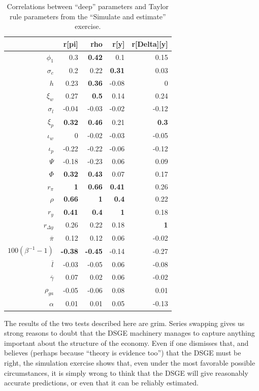 \documentclass[11pt]{article}
\begin{document}
\begin{table}

\caption{\label{tab:covary-with-Taylor}Correlations between ``deep'' parameters and Taylor rule parameters from the ``Simulate and estimate'' exercise.}
\centering
\begin{tabular}[t]{rrrrr}
\toprule
 & r[pi] & rho & r[y] & r[Delta][y]\\
\midrule
$\phi_1$ & 0.3 & \textbf{0.42} & 0.1 & 0.15\\
$\sigma_c$ & 0.2 & 0.22 & \textbf{0.31} & 0.03\\
$h$ & 0.23 & \textbf{0.36} & -0.08 & 0\\
$\xi_w$ & 0.27 & \textbf{0.5} & 0.14 & 0.24\\
$\sigma_l$ & -0.04 & -0.03 & -0.02 & -0.12\\
\addlinespace
$\xi_p$ & \textbf{0.32} & \textbf{0.46} & 0.21 & \textbf{0.3}\\
$\iota_w$ & 0 & -0.02 & -0.03 & -0.05\\
$\iota_p$ & -0.22 & -0.22 & -0.06 & -0.12\\
$\Psi$ & -0.18 & -0.23 & 0.06 & 0.09\\
$\Phi$ & \textbf{0.32} & \textbf{0.43} & 0.07 & 0.17\\
\addlinespace
$r_\pi$ & \textbf{1} & \textbf{0.66} & \textbf{0.41} & 0.26\\
$\rho$ & \textbf{0.66} & \textbf{1} & \textbf{0.4} & 0.22\\
$r_y$ & \textbf{0.41} & \textbf{0.4} & \textbf{1} & 0.18\\
$r_{\Delta y}$ & 0.26 & 0.22 & 0.18 & \textbf{1}\\
$\overline{\pi}$ & 0.12 & 0.12 & 0.06 & -0.02\\
\addlinespace
$100(\beta^{-1} -1)$ & \textbf{-0.38} & \textbf{-0.45} & -0.14 & -0.27\\
$\overline{l}$ & -0.03 & -0.05 & 0.06 & -0.08\\
$\overline{\gamma}$ & 0.07 & 0.02 & 0.06 & -0.02\\
$\rho_{ga}$ & -0.05 & -0.06 & 0.08 & 0.01\\
$\alpha$ & 0.01 & 0.01 & 0.05 & -0.13\\
\bottomrule
\end{tabular}
\end{table}

The results of the two tests described here are grim. Series swapping
gives us strong reasons to doubt that the DSGE machinery manages to
capture anything important about the structure of the economy. Even if
one dismisses that, and believes (perhaps because ``theory is evidence
too'') that the DSGE must be right, the simulation exercise shows that,
even under the most favorable possible circumstances, it is simply wrong
to think that the DSGE will give reasonably accurate predictions, or
even that it can be reliably estimated.
\end{document}
